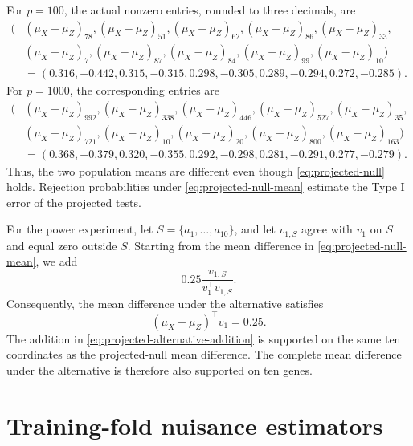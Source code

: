 \documentclass[11pt]{article}
\begin{document}
For $p=100$, the actual nonzero entries, rounded to three decimals, are
\begin{align*}
\big(&\left(\mu_X-\mu_Z\right)_{78},
\left(\mu_X-\mu_Z\right)_{51},
\left(\mu_X-\mu_Z\right)_{62},
\left(\mu_X-\mu_Z\right)_{86},
\left(\mu_X-\mu_Z\right)_{33},\\
&\left(\mu_X-\mu_Z\right)_{7},
\left(\mu_X-\mu_Z\right)_{87},
\left(\mu_X-\mu_Z\right)_{84},
\left(\mu_X-\mu_Z\right)_{99},
\left(\mu_X-\mu_Z\right)_{10}\big)\\
&=(0.316,-0.442,0.315,-0.315,0.298,-0.305,
0.289,-0.294,0.272,-0.285).
\end{align*}
For $p=1000$, the corresponding entries are
\begin{align*}
\big(&\left(\mu_X-\mu_Z\right)_{992},
\left(\mu_X-\mu_Z\right)_{338},
\left(\mu_X-\mu_Z\right)_{446},
\left(\mu_X-\mu_Z\right)_{527},
\left(\mu_X-\mu_Z\right)_{35},\\
&\left(\mu_X-\mu_Z\right)_{721},
\left(\mu_X-\mu_Z\right)_{10},
\left(\mu_X-\mu_Z\right)_{20},
\left(\mu_X-\mu_Z\right)_{800},
\left(\mu_X-\mu_Z\right)_{163}\big)\\
&=(0.368,-0.379,0.320,-0.355,0.292,-0.298,
0.281,-0.291,0.277,-0.279).
\end{align*}
Thus, the two population means are different even though
\eqref{eq:projected-null} holds. Rejection probabilities under
\eqref{eq:projected-null-mean} estimate the Type I error of the projected
tests.

For the power experiment, let $S=\{a_1,\ldots,a_{10}\}$, and let $v_{1,S}$
agree with $v_1$ on $S$ and equal zero outside $S$. Starting from the mean difference in
\eqref{eq:projected-null-mean}, we add
\begin{equation}
0.25\frac{v_{1,S}}{v_1^\top v_{1,S}}.
\label{eq:projected-alternative-addition}
\end{equation}
Consequently, the mean difference under the alternative satisfies
\begin{equation}
\left(\mu_X-\mu_Z\right)^\top v_1=0.25.
\label{eq:projected-alternative}
\end{equation}
The addition in \eqref{eq:projected-alternative-addition} is supported on the
same ten coordinates as the projected-null mean difference. The complete mean
difference under the alternative is therefore also supported on ten genes.


\section{Training-fold nuisance estimators}
\end{document}
